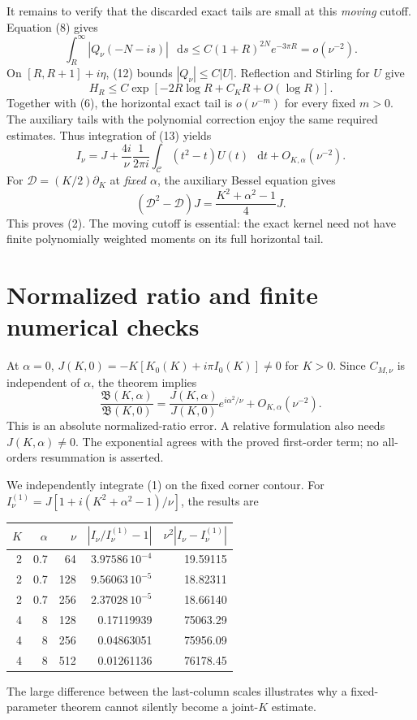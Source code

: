 \documentclass[11pt,a4paper]{article}
\newcommand{\dd}{\mathop{}\!\mathrm d}
\newcommand{\Q}{Q_\nu}
\begin{document}
It remains to verify that the discarded exact tails are small at
this \emph{moving} cutoff. Equation (8) gives
\[
 \int_R^\infty|\Q(-N-is)|\,\dd s
 \le C(1+R)^{2N}e^{-3\pi R}=o(\nu^{-2}).
\]
On \([R,R+1]+i\eta\), (12) bounds \(|\Q|\le C|U|\).
Reflection and Stirling for \(U\) give
\[
 H_R\le C\exp[-2R\log R+C_KR+O(\log R)] .
\]
Together with (6), the horizontal exact tail is \(o(\nu^{-m})\)
for every fixed \(m>0\). The auxiliary tails with the polynomial
correction enjoy the same required estimates.
Thus integration of (13) yields
\[
 I_\nu=J+\frac{4i}{\nu}\frac1{2\pi i}
 \int_{\mathcal C}(t^2-t)U(t)\,\dd t+O_{K,\alpha}(\nu^{-2}).
\]
For \(\mathcal D=(K/2)\partial_K\) at \emph{fixed \(\alpha\)},
the auxiliary Bessel equation gives
\[
 (\mathcal D^2-\mathcal D)J
 =\frac{K^2+\alpha^2-1}{4}J.
\]
This proves (2). The moving cutoff is essential: the exact kernel
need not have finite polynomially weighted moments on its full
horizontal tail.

\newpage
\section{Normalized ratio and finite numerical checks}
At \(\alpha=0\), \(J(K,0)=-K[K_0(K)+i\pi I_0(K)]\ne0\) for \(K>0\).
Since \(C_{M,\nu}\) is independent of \(\alpha\), the theorem implies
\[
 \frac{\mathfrak B(K,\alpha)}{\mathfrak B(K,0)}
 =\frac{J(K,\alpha)}{J(K,0)}e^{i\alpha^2/\nu}
 +O_{K,\alpha}(\nu^{-2}). \tag{14}
\]
This is an absolute normalized-ratio error. A relative formulation
also needs \(J(K,\alpha)\ne0\).
The exponential agrees with the proved first-order term;
no all-orders resummation is asserted.

We independently integrate (1) on the fixed corner contour.
For \(I_\nu^{(1)}=J[1+i(K^2+\alpha^2-1)/\nu]\), the results are
\begin{center}\begin{tabular}{rrrrr}\toprule
\(K\)&\(\alpha\)&\(\nu\)&\(|I_\nu/I_\nu^{(1)}-1|\)&
\(\nu^2|I_\nu-I_\nu^{(1)}|\)\\\midrule
2&0.7&64&\(3.97586\,10^{-4}\)&19.59115\\
2&0.7&128&\(9.56063\,10^{-5}\)&18.82311\\
2&0.7&256&\(2.37028\,10^{-5}\)&18.66140\\
4&8&128&0.17119939&75063.29\\
4&8&256&0.04863051&75956.09\\
4&8&512&0.01261136&76178.45\\\bottomrule
\end{tabular}\end{center}
The large difference between the last-column scales illustrates why
a fixed-parameter theorem cannot silently become a joint-\(K\) estimate.
\end{document}
